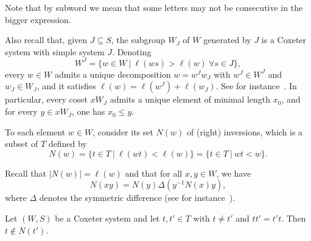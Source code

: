 \documentclass[ALCO, Unicode]{cedram}
\begin{document}
Note that by subword we mean that some letters may not be consecutive in the bigger expression. 

Also recall that, given $J\subseteq S$, the subgroup $W_J$ of $W$ generated by $J$ is a Coxeter system with simple system $J$. Denoting $$W^J=\{w\in W \ \vert \ \ell(ws)>\ell(w)~\forall s\in J\},$$ every $w\in W$ admits a unique decomposition $w=w^J w_J$ with $w^J\in W^J$ and $w_J \in W_J$, and it satisfies $\ell(w)=\ell(w^J)+\ell(w_J)$. See for instance~\cite[Section 2.4]{BB}. In particular, every coset $x W_J$ admits a unique element of minimal length $x_0$, and for every $y\in x W_J$, one has $x_0 \leq y$. 

To each element $w\in W$, consider its set $N(w)$ of (right) inversions, which is a subset of $T$ defined by $$N(w)=\{t\in T \ \vert \ \ell(wt)<\ell(w)\}=\{t\in T \ \vert \ wt<w\}.$$

Recall that $|N(w)|=\ell(w)$ and that for all $x,y\in W$, we have $$N(xy)=N(y)\Delta (y^{-1} N(x) y),$$ where $\Delta$ denotes the symmetric difference (see for instance~\cite[Chapter 1, Exercise 12]{BB}).

\begin{lemma}\label{lem_ref_commute}
	Let $(W,S)$ be a Coxeter system and let $t, t'\in T$ with $t\neq t'$ and $tt'=t't$. Then $t\notin N(t')$. 
\end{lemma}
\end{document}
